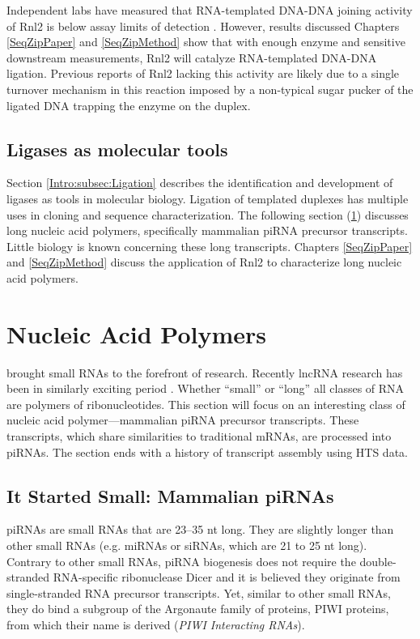     Independent labs have measured that RNA-templated DNA-DNA joining activity of Rnl2 is below assay limits of detection \citep{Bullard2006}. However, results discussed Chapters \ref{SeqZipPaper} and \ref{SeqZipMethod} show that with enough enzyme and sensitive downstream measurements, Rnl2 will catalyze RNA-templated DNA-DNA ligation. Previous reports of Rnl2 lacking this activity are likely due to a single turnover mechanism in this reaction imposed by a non-typical sugar pucker of the ligated DNA trapping the enzyme on the duplex.

  \subsection{Ligases as molecular tools}

    Section \ref{Intro:subsec:Ligation} describes the identification and development of ligases as tools in molecular biology. Ligation of templated duplexes has multiple uses in cloning and sequence characterization. The following section (\ref{Intro:sec:Nucleic Acid Polymers}) discusses long nucleic acid polymers, specifically mammalian piRNA precursor transcripts. Little biology is known concerning these long transcripts. Chapters \ref{SeqZipPaper} and \ref{SeqZipMethod} discuss the application of Rnl2 to characterize long nucleic acid polymers.

\section{Nucleic Acid Polymers}
  \label{Intro:sec:Nucleic Acid Polymers}

  \citet{Fire1998} brought small RNAs to the forefront of research. Recently lncRNA research has been in similarly exciting period \citep{Khalil2009,Guttman2009}. Whether ``small'' or ``long'' all classes of RNA are polymers of ribonucleotides. This section will focus on an interesting class of nucleic acid polymer---mammalian piRNA precursor transcripts. These transcripts, which share similarities to traditional mRNAs, are processed into piRNAs. The section ends with a history of transcript assembly using HTS data.

  \subsection{It Started Small: Mammalian piRNAs}

    piRNAs are small RNAs that are 23--35 nt long. They are slightly longer than other small RNAs (e.g. miRNAs or siRNAs, which are 21 to 25 nt long). Contrary to other small RNAs, piRNA biogenesis does not require the double-stranded RNA-specific ribonuclease Dicer \citep{Vagin2006, Houwing2007} and it is believed they originate from single-stranded RNA precursor transcripts. Yet, similar to other small RNAs, they do bind a subgroup of the Argonaute family of proteins, PIWI proteins, from which their name is derived (\textit{PIWI Interacting RNAs}).

